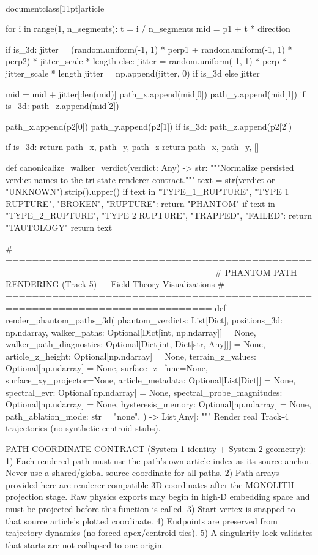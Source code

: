 \\documentclass[11pt]{article}
\begin{document}
\begin{CodeBlock}
{{    for i in range(1, n_segments):
        t = i / n_segments
        mid = p1 + t * direction

        if is_3d:
            jitter = (random.uniform(-1, 1) * perp1 +
                      random.uniform(-1, 1) * perp2) * jitter_scale * length
        else:
            jitter = random.uniform(-1, 1) * perp * jitter_scale * length
            jitter = np.append(jitter, 0) if is_3d else jitter

        mid = mid + jitter[:len(mid)]
        path_x.append(mid[0])
        path_y.append(mid[1])
        if is_3d:
            path_z.append(mid[2])

    path_x.append(p2[0])
    path_y.append(p2[1])
    if is_3d:
        path_z.append(p2[2])

    if is_3d:
        return path_x, path_y, path_z
    return path_x, path_y, []


def canonicalize_walker_verdict(verdict: Any) -> str:
    """Normalize persisted verdict names to the tri-state renderer contract."""
    text = str(verdict or "UNKNOWN").strip().upper()
    if text in {"TYPE_1_RUPTURE", "TYPE 1 RUPTURE", "BROKEN", "RUPTURE"}:
        return "PHANTOM"
    if text in {"TYPE_2_RUPTURE", "TYPE 2 RUPTURE", "TRAPPED", "FAILED"}:
        return "TAUTOLOGY"
    return text


# =============================================================================
# PHANTOM PATH RENDERING (Track 5) — Field Theory Visualizations
# =============================================================================
def render_phantom_paths_3d(
    phantom_verdicts: List[Dict],
    positions_3d: np.ndarray,
    walker_paths: Optional[Dict[int, np.ndarray]] = None,
    walker_path_diagnostics: Optional[Dict[int, Dict[str, Any]]] = None,
    article_z_height: Optional[np.ndarray] = None,
    terrain_z_values: Optional[np.ndarray] = None,
    surface_z_func=None,
    surface_xy_projector=None,
    article_metadata: Optional[List[Dict]] = None,
    spectral_evr: Optional[np.ndarray] = None,
    spectral_probe_magnitudes: Optional[np.ndarray] = None,
    hysteresis_memory: Optional[np.ndarray] = None,
    path_ablation_mode: str = "none",
) -> List[Any]:
    """
    Render real Track-4 trajectories (no synthetic centroid stubs).

    PATH COORDINATE CONTRACT (System-1 identity + System-2 geometry):
    1) Each rendered path must use the path's own article index as its source anchor.
       Never use a shared/global source coordinate for all paths.
    2) Path arrays provided here are renderer-compatible 3D coordinates after
       the MONOLITH projection stage. Raw physics exports may begin in high-D
       embedding space and must be projected before this function is called.
    3) Start vertex is snapped to that source article's plotted coordinate.
    4) Endpoints are preserved from trajectory dynamics (no forced apex/centroid ties).
    5) A singularity lock validates that starts are not collapsed to one origin.

}}
\end{CodeBlock}
\end{document}
